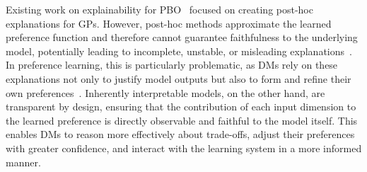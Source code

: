 \documentclass{article}
\begin{document}

Existing work on explainability for PBO~\cite{Chakraborty2026, gutierrez2024explainable,rodemann2025explaining} focused on creating post-hoc explanations for GPs. However, post-hoc methods approximate the learned preference function and therefore cannot guarantee faithfulness to the underlying model, potentially leading to incomplete, unstable, or misleading explanations~\cite{Rudin2019}. In preference learning, this is particularly problematic, as DMs rely on these explanations not only to justify model outputs but also to form and refine their own preferences~\cite{Chakraborty2026}. 
Inherently interpretable models, on the other hand, are transparent by design, ensuring that the contribution of each input dimension to the learned preference is directly observable and faithful to the model itself. 
This enables DMs to reason more effectively about trade-offs, adjust their preferences with greater confidence, and interact with the learning system in a more informed manner. 
\end{document}
